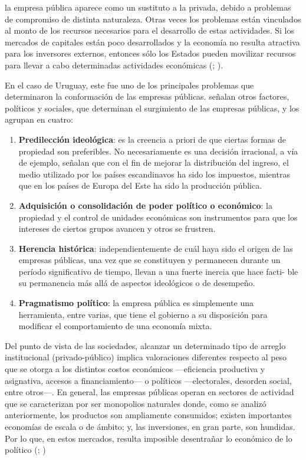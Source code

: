 \documentclass[
  12pt,
  spanish,
]{book}
\begin{document}
la empresa pública aparece como un sustituto a la privada, debido a problemas de compromiso de distinta naturaleza.
Otras veces los problemas están vinculados al monto de los recursos necesarios para el desarrollo de estas actividades. Si los mercados de capitales están poco desarrollados y la economía no resulta atractiva para los inversores externos, entonces sólo los Estados pueden movilizar recursos para llevar a cabo determinadas actividades económicas (\citet{Mintz1982}; \citet{LaPorta1998}).

En el caso de Uruguay, este fue uno de los principales problemas que determinaron la conformación de las empresas públicas. \citet{Jones1982} señalan otros factores, políticos y sociales, que determinan el surgimiento de las empresas públicas, y los agrupan en cuatro:

\begin{enumerate}
\def\labelenumi{\arabic{enumi}.}
\item
  \textbf{Predilección ideológica}: es la creencia a priori de que ciertas formas de propiedad son preferibles. No necesariamente es una decisión irracional, a vía de ejemplo, señalan que con el fin de mejorar la distribución del ingreso, el medio utilizado por los países escandinavos ha sido los impuestos, mientras que en los países de Europa del Este ha sido la producción pública.
\item
  \textbf{Adquisición o consolidación de poder político o económico}: la propiedad y el control de unidades económicas son instrumentos para que los intereses de ciertos grupos avancen y otros se frustren.
\item
  \textbf{Herencia histórica}: independientemente de cuál haya sido el origen de las empresas públicas, una vez que se constituyen y permanecen durante un período significativo de tiempo, llevan a una fuerte inercia que hace facti-
  ble su permanencia más allá de aspectos ideológicos o de desempeño.
\item
  \textbf{Pragmatismo político}: la empresa pública es simplemente una herramienta, entre varias, que tiene el gobierno a su disposición para modificar el comportamiento de una economía mixta.
\end{enumerate}

Del punto de vista de las sociedades, alcanzar un determinado tipo de arreglo institucional (privado-público) implica valoraciones diferentes respecto al peso que se otorga a los distintos costos económicos ---eficiencia productiva y asignativa, accesos a financiamiento--- o políticos ---electorales, desorden social, entre otros---. En general, las empresas públicas operan en sectores de actividad que se caracterizan por ser monopolios naturales donde, como se analizó anteriormente, los productos son ampliamente consumidos; existen importantes economías de escala o de ámbito; y, las inversiones, en gran parte, son hundidas. Por lo que, en estos mercados, resulta imposible desentrañar lo económico de lo político (\citet{Bergara2003}; \citet{Spiller2013})
\end{document}
